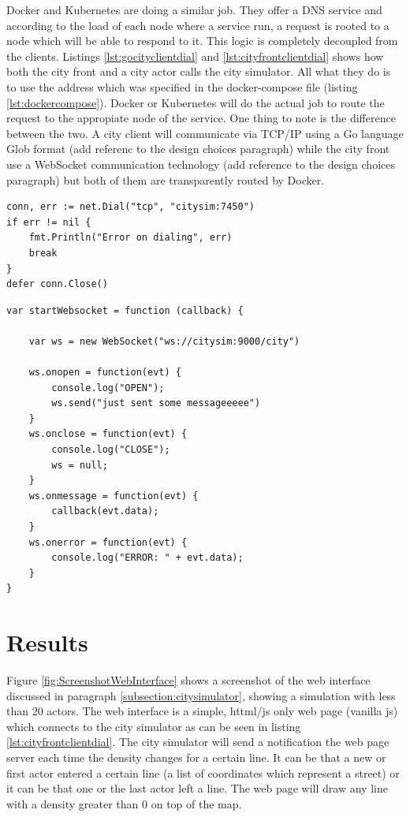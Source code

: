 \documentclass[conference]{IEEEtran}
\begin{document}
Docker and Kubernetes are doing a similar job. They offer a DNS service and according to the load of each node where a service run, a request is rooted to a node which will be able to respond to it. This logic is completely decoupled from the clients. Listings \ref{lst:gocityclientdial} and \ref{lst:cityfrontclientdial} shows how both the city front and a city actor calls the city simulator. All what they do is to use the address which was specified in the docker-compose file (listing \ref{lst:dockercompose}). Docker or Kubernetes will do the actual job to route the request to the appropiate node of the service. One thing to note is the difference between the two. A city client will communicate via TCP/IP using a Go language Glob format (add referenc to the design choices paragraph) while the city front use a WebSocket communication technology (add reference to the design choices paragraph) but both of them are transparently routed by Docker.

\begin{lstlisting}[caption=City actor dialing City simulator, label=lst:gocityclientdial]
conn, err := net.Dial("tcp", "citysim:7450")
if err != nil {
    fmt.Println("Error on dialing", err)
    break
}
defer conn.Close()
\end{lstlisting}

\begin{lstlisting}[caption=City front dialing City simulator, label=lst:cityfrontclientdial]
var startWebsocket = function (callback) {

    var ws = new WebSocket("ws://citysim:9000/city")

    ws.onopen = function(evt) {
        console.log("OPEN");
        ws.send("just sent some messageeeee")
    }
    ws.onclose = function(evt) {
        console.log("CLOSE");
        ws = null;
    }
    ws.onmessage = function(evt) {
        callback(evt.data);
    }
    ws.onerror = function(evt) {
        console.log("ERROR: " + evt.data);
    }
}
\end{lstlisting}

\section{Results}
\label{sec:results}

Figure \ref{fig:ScreenshotWebInterface} shows a screenshot of the web interface discussed in paragraph \ref{subsection:citysimulator}, showing a simulation with less than 20 actors. The web interface is a simple, httml/js only web page (vanilla js) which connects to the city simulator as can be seen in listing \ref{lst:cityfrontclientdial}. The city simulator will send a notification the web page server each time the density changes for a certain line. It can be that a new or first actor entered a certain line (a list of coordinates which represent a street) or it can be that one or the last actor left a line. The web page will draw any line with a density greater than 0 on top of the map.
\end{document}
